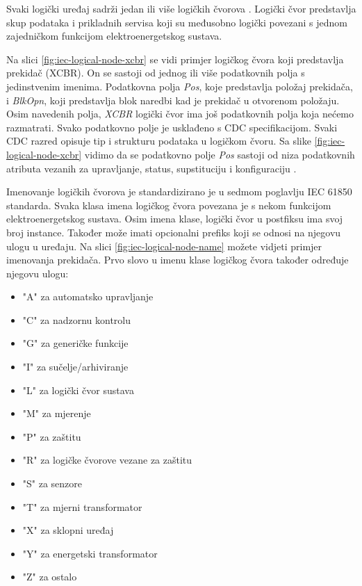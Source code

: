 \documentclass[times, utf8, zavrsni]{fer}
\begin{document}
Svaki logički uređaj sadrži jedan ili više logičkih čvorova . Logički čvor predstavlja skup podataka i prikladnih servisa koji su međusobno logički povezani s jednom zajedničkom funkcijom elektroenergetskog sustava.

Na slici \ref{fig:iec-logical-node-xcbr} se vidi primjer logičkog čvora koji predstavlja prekidač (XCBR). On se sastoji od jednog ili više podatkovnih polja s jedinstvenim imenima. Podatkovna polja \textit{Pos}, koje predstavlja položaj prekidača, i \textit{BlkOpn}, koji predstavlja blok naredbi kad je prekidač u otvorenom položaju. Osim navedenih polja, \textit{XCBR} logički čvor ima još podatkovnih polja koja nećemo razmatrati. Svako podatkovno polje je usklađeno s CDC specifikacijom. Svaki CDC razred opisuje tip i strukturu podataka u logičkom čvoru. Sa slike \ref{fig:iec-logical-node-xcbr} vidimo da se podatkovno polje \textit{Pos} sastoji od niza podatkovnih atributa vezanih za upravljanje, status, supstituciju i konfiguraciju \citep{baigent2004iec}.

\bigskip
Imenovanje logičkih čvorova je standardizirano je u sedmom poglavlju IEC 61850 standarda. Svaka klasa imena logičkog čvora povezana je s nekom funkcijom elektroenergetskog sustava. Osim imena klase, logički čvor u postfiksu ima svoj broj instance. Također može imati opcionalni prefiks koji se odnosi na njegovu ulogu u uređaju. Na slici \ref{fig:iec-logical-node-name} možete vidjeti primjer imenovanja prekidača. Prvo slovo u imenu klase logičkog čvora također određuje njegovu ulogu:

\begin{itemize}
    \item "A" za automatsko upravljanje
    \item "C" za nadzornu kontrolu
    \item "G" za generičke funkcije
    \item "I" za sučelje/arhiviranje
    \item "L" za logički čvor sustava
    \item "M" za mjerenje
    \item "P" za zaštitu
    \item "R" za logičke čvorove vezane za zaštitu
    \item "S" za senzore
    \item "T" za mjerni transformator
    \item "X" za sklopni uređaj
    \item "Y" za energetski transformator
    \item "Z" za ostalo
\end{itemize}
\end{document}

